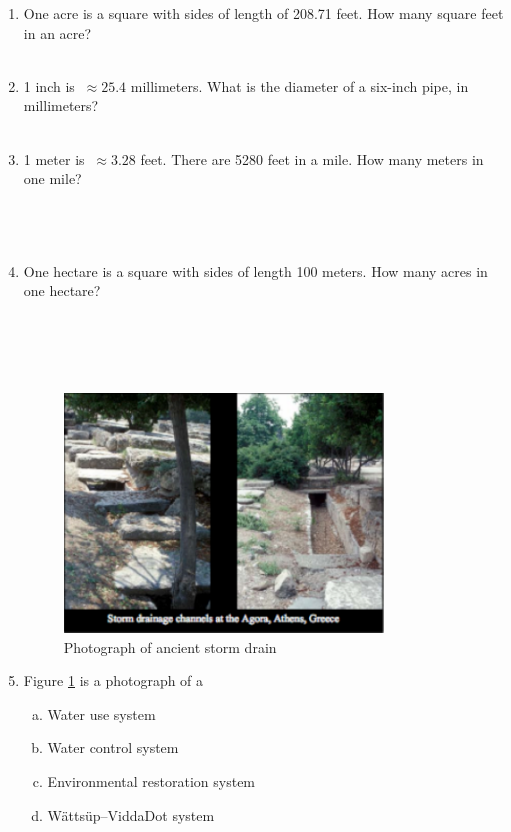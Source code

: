 \documentclass[11pt]{article}
\begin{document}


\begin{enumerate}
\item One acre is a square with sides of length of 208.71 feet.  How many square feet in an acre?
~\\
~\\
\item 1 inch is $~\approx 25.4$ millimeters.  What is the diameter of a six-inch pipe, in millimeters?
~\\
~\\
\item 1 meter is $~\approx 3.28$ feet.   There are 5280 feet in a mile.   How many meters in one mile?
~\\
~\\
~\\
~\\
\item One hectare is a square with sides of length 100 meters.  How many acres in one hectare?
~\\
~\\
~\\
~\\
~\\
\begin{figure}[h!] %
   \centering
   \includegraphics[height=2.5in]{greek-storm-drain.pdf} 
   \caption{Photograph of ancient storm drain}
   \label{fig:greek-storm-drain}
\end{figure}
\item Figure \ref{fig:greek-storm-drain} is a photograph of a
\begin{enumerate}[(a)]
\item Water use system
\item Water control system
\item Environmental restoration system
\item W{\"a}tts{\"u}p--Vidda{{Dot}}\texttrademark{} system
\end{enumerate}


\end{enumerate}
\end{document}
